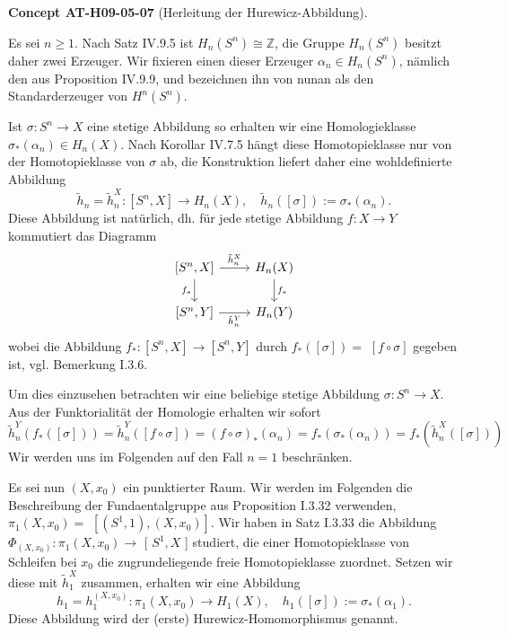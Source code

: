 \documentclass[10pt, letterpaper]{article}
\newcommand{\CustomHeading}[3]{%
  \par\medskip\noindent%
  \textbf{#1 #2} \textnormal{(#3)}.\enskip%
}
\newenvironment{CONC}[2]{\begin{unitbox}\CustomHeading{Concept}{#1}{#2}}{\end{unitbox}}
\begin{document}
\begin{CONC}{AT-H09-05-07}{Herleitung der Hurewicz-Abbildung}
Es sei $n \geq 1$. Nach Satz IV.9.5 ist $H_n\left(S^n\right) \cong \mathbb{Z}$, die Gruppe $H_n\left(S^n\right)$ besitzt daher zwei Erzeuger. Wir fixieren einen dieser Erzeuger $\alpha_n \in H_n\left(S^n\right)$, nämlich den aus Proposition IV.9.9, und bezeichnen ihn von nunan als den Standarderzeuger von $H^n\left(S^n\right)$.

Ist $\sigma: S^n \rightarrow X$ eine stetige Abbildung so erhalten wir eine Homologieklasse $\sigma_*\left(\alpha_n\right) \in H_n(X)$. Nach Korollar IV.7.5 hängt diese Homotopieklasse nur von der Homotopieklasse von $\sigma$ ab, die Konstruktion liefert daher eine wohldefinierte Abbildung
$$
\tilde{h}_n=\tilde{h}_n^X:\left[S^n, X\right] \rightarrow H_n(X), \quad \tilde{h}_n([\sigma]):=\sigma_*\left(\alpha_n\right) .
$$
Diese Abbildung ist natürlich, dh. für jede stetige Abbildung $f: X \rightarrow Y$ kommutiert das Diagramm
\[
\begin{tikzcd}
{[S^n, X]} \arrow[r, "\tilde{h}_n^X"] \arrow[d, "f_*"'] & H_n(X) \arrow[d, "f_*"] \\
{[S^n, Y]} \arrow[r, "\tilde{h}_n^Y"'] & H_n(Y)
\end{tikzcd}
\]
wobei die Abbildung $f_*:\left[S^n, X\right] \rightarrow\left[S^n, Y\right]$ durch $f_*([\sigma])=$ $[f \circ \sigma]$ gegeben ist, vgl. Bemerkung I.3.6. 

Um dies einzusehen betrachten wir eine beliebige stetige Abbildung $\sigma: S^n \rightarrow X$. Aus der Funktorialität der Homologie erhalten wir sofort 
$$\tilde{h}_n^Y\left(f_*([\sigma])\right)=\tilde{h}_n^Y([f \circ \sigma])=(f \circ \sigma)_*\left(\alpha_n\right)=f_*\left(\sigma_*\left(\alpha_n\right)\right)=f_*\left(\tilde{h}_n^X([\sigma])\right)$$ 
Wir werden uns im Folgenden auf den Fall $n=1$ beschränken.

Es sei nun $(X, x_0)$ ein punktierter Raum. Wir werden im Folgenden die Beschreibung der Fundaentalgruppe aus Proposition I.3.32 verwenden, $\pi_1\left(X, x_0\right)=$ $\left[\left(S^1, 1\right),\left(X, x_0\right)\right]$. Wir haben in Satz I.3.33 die Abbildung $\Phi_{\left(X, x_0\right)}: \pi_1\left(X, x_0\right) \rightarrow$ [ $S^1, X$ ] studiert, die einer Homotopieklasse von Schleifen bei $x_0$ die zugrundeliegende freie Homotopieklasse zuordnet. Setzen wir diese mit $\tilde{h}_1^X$ zusammen, erhalten wir eine Abbildung
$$
h_1=h_1^{\left(X, x_0\right)}: \pi_1\left(X, x_0\right) \rightarrow H_1(X), \quad h_1([\sigma]):=\sigma_*\left(\alpha_1\right) .
$$
Diese Abbildung wird der (erste) Hurewicz-Homomorphismus genannt.
\end{CONC}
\end{document}
